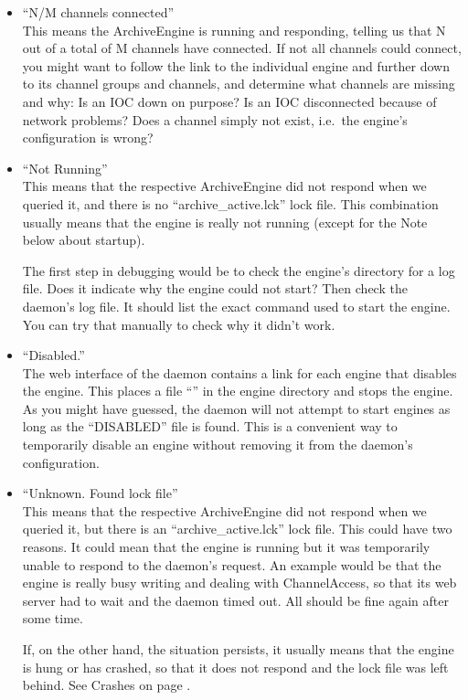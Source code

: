 \begin{itemize}
\item ``N/M channels connected''\\
      This means the ArchiveEngine is running and responding,
      telling us that N out of a total of M channels have connected.
      If not all channels could connect, you might want to follow
      the link to the individual engine and further down to its
      channel groups and channels, and determine what channels are
      missing and why: Is an IOC down on purpose? Is an IOC
      disconnected because of network problems? Does a channel simply
      not exist, i.e.\ the engine's configuration is wrong?
\item ``Not Running''\\
      This means that the respective ArchiveEngine did not respond
      when we queried it, and there is no ``archive\_active.lck'' lock
      file. This combination usually means that the engine is really
      not running (except for the Note below about startup).

      The first step in debugging would be to check the engine's
      directory for a log file. Does it indicate why the engine could
      not start? Then check the daemon's log file. It should list the
      exact command used to start the engine. You can try that
      manually to check why it didn't work.
\item ``Disabled.''\\
      The web interface of the daemon contains a link for each engine
      that disables the engine. This places a file
      ``'' in the engine directory and stops the
      engine.  As you might have guessed, the daemon will not attempt
      to start engines as long as the ``DISABLED'' file is found. This
      is a convenient way to temporarily disable an engine without
      removing it from the daemon's configuration.
\item ``Unknown. Found lock file''\\
      This means that the respective ArchiveEngine did not respond
      when we queried it, but there is an ``archive\_active.lck'' lock
      file. This could have two reasons. It could mean that the engine
      is running but it was temporarily unable to respond to the
      daemon's request. An example would be that the engine is really
      busy writing and dealing with ChannelAccess, so that its web
      server had to wait and the daemon timed out. All should be fine
      again after some time.

      If, on the other hand, the situation persists, it usually means
      that the engine is hung or has crashed, so that it does not
      respond and the lock file was left behind.
      See Crashes on page \pageref{sec:crash}.
\end{itemize}

